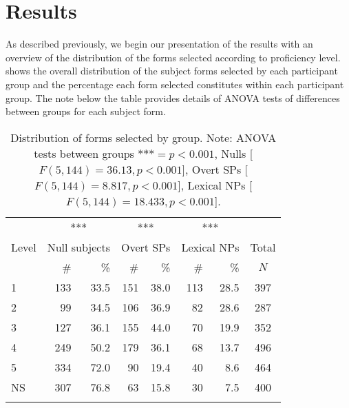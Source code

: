 \documentclass[output=paper]{langscibook}
\begin{document}
\section{Results}\label{sec:geeslin:6}
\begin{sloppypar}
As described previously, we begin our presentation of the results with an overview of the distribution of the forms selected according to proficiency level.  shows the overall distribution of the subject forms selected by each participant group and the percentage each form selected constitutes within each participant group. The note below the table provides details of ANOVA tests of differences between groups for each subject form.
\end{sloppypar}

\begin{table}
\begin{tabular}{l *{6}{r} c}
 \lsptoprule
         & \multicolumn{2}{c}{***} & \multicolumn{2}{c}{***} & \multicolumn{2}{c}{***} & \\
 {Level} & \multicolumn{2}{l}{Null subjects} & \multicolumn{2}{l}{Overt SPs} & \multicolumn{2}{l}{Lexical NPs} & {Total}\\\cmidrule(lr){2-3}\cmidrule(lr){4-5}\cmidrule(lr){6-7}
 & {\#} & {\%} & {\#} & {\%} & {\#} & {\%} & {$N$}\\
 \midrule
 1 &  133 &  33.5 &  151 &  38.0 &  113 &  28.5 &  397\\
 2 &  99 &  34.5 &  106 &  36.9 &  82 &  28.6 &  287\\
 
 3 &  127 &  36.1 &  155 &  44.0 &  70 &  19.9 &  352\\
 4 &  249 &  50.2 &  179 &  36.1 &  68 &  13.7 &  496\\
 5 &  334 &  72.0 &  90 &  19.4 &  40 &  8.6 &  464\\
 NS &  307 &  76.8 &  63 &  15.8 &  30 &  7.5 &  400\\
 \lspbottomrule
\end{tabular}
\caption{Distribution of forms selected by group. Note: ANOVA tests between groups $\text{***}=p<0.001$,   Nulls [$F (5,144) = 36.13,\allowbreak p<0.001$], Overt SPs [$F (5,144) = 8.817,\allowbreak p<0.001$], Lexical NPs [$F (5,144) = 18.433,\allowbreak p<0.001$].\label{tab:geeslin:7}}
\end{table}
\end{document}
